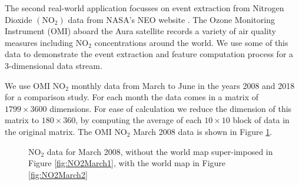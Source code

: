 \documentclass[a4paper,11pt]{article}
\begin{document}
The second real-world application focusses on event extraction from Nitrogen Dioxide $(\text{NO}_2)$ data from NASA's NEO website \cite{OMINO2}. The Ozone Monitoring Instrument (OMI) \cite{levelt2006ozone} aboard the Aura satellite records a variety of air quality measures including $\text{NO}_2$ concentrations around the world. We use some of this data to demonstrate the event extraction and feature computation process for a 3-dimensional data stream.

We use OMI $\text{NO}_2$ monthly data from March to June in the years 2008 and 2018 for a comparison study. For each month the data comes in a matrix of $1799 \times 3600 $ dimensions. For ease of calculation we reduce the dimension of this matrix to $180 \times 360 $, by computing the average of each $10 \times 10$ block of data in the original matrix. The OMI $\text{NO}_2$ March 2008 data is shown in Figure \ref{fig:NO2March2008}.

\begin{figure}[H]
	\centering
	\caption{\footnotesize $\text{NO}_2$ data for March 2008, without the world map super-imposed in Figure \ref{fig:NO2March1}, with the world map in Figure \ref{fig:NO2March2} }
	\label{fig:NO2March2008}
\end{figure}
\end{document}
